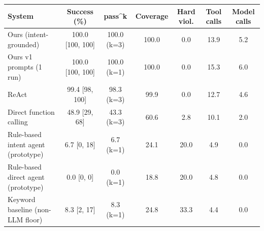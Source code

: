 \begin{tabular}{lcccccc}
\toprule
System & Success (\%) & pass\textasciicircum{}k & Coverage & Hard viol. & Tool calls & Model calls \\
\midrule
Ours (intent-grounded) & 100.0 {\scriptsize[100, 100]} & 100.0 (k=3) & 100.0 & 0.0 & 13.9 & 5.2 \\
Ours v1 prompts (1 run) & 100.0 {\scriptsize[100, 100]} & 100.0 (k=1) & 100.0 & 0.0 & 15.3 & 6.0 \\
ReAct & 99.4 {\scriptsize[98, 100]} & 98.3 (k=3) & 99.9 & 0.0 & 12.7 & 4.6 \\
Direct function calling & 48.9 {\scriptsize[29, 68]} & 43.3 (k=3) & 60.6 & 2.8 & 10.1 & 2.0 \\
Rule-based intent agent (prototype) & 6.7 {\scriptsize[0, 18]} & 6.7 (k=1) & 24.1 & 20.0 & 4.9 & 0.0 \\
Rule-based direct agent (prototype) & 0.0 {\scriptsize[0, 0]} & 0.0 (k=1) & 18.8 & 20.0 & 4.8 & 0.0 \\
Keyword baseline (non-LLM floor) & 8.3 {\scriptsize[2, 17]} & 8.3 (k=1) & 24.8 & 33.3 & 4.4 & 0.0 \\
\bottomrule
\end{tabular}

